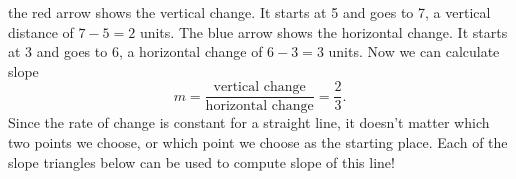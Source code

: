 \begin{center}
\begin{minipage}{0.49\textwidth}
\end{minipage}
\end{center}
the red arrow shows the vertical change. It starts at 5 and goes to 7, a vertical distance of $7-5=2$ units. The blue arrow shows the horizontal change. It starts at 3 and goes to 6, a horizontal change of $6-3=3$ units. Now we can calculate slope \[m = \frac{\text{vertical change}}{\text{horizontal change}} = \frac{2}{3}.\] Since the rate of change is constant for a straight line, it doesn't matter which two points we choose, or which point we choose as the starting place. Each of the slope triangles below can be used to compute slope of this line!

